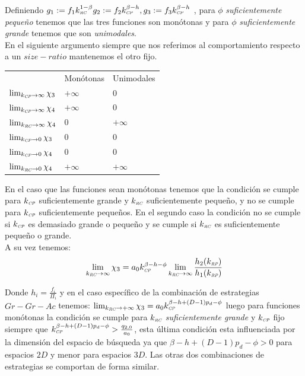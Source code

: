 Definiendo $g_1:= f_1 k_{\textit{\tiny RC}}^{1-\beta} g_2:= f_2 k_{\textit{\tiny CP}}^{\beta- h} , g_3 := f_3 k_{\textit{\tiny CP}}^{\beta-h} $ , para $\phi$ \emph{suficientemente peque\~no} tenemos que las tres funciones son mon\'otonas y para $\phi$ \emph{suficientemente grande} tenemos que son \emph{unimodales}.\\

En el siguiente argumento siempre que nos referimos al comportamiento respecto a un $size-ratio$ mantenemos el otro fijo.\\

\begin{tabular}{p{1.5in}|m{1.5in}|m{1.5in}} 
 & Mon\'otonas  & Unimodales \\
$\lim_{k_{\textit{\tiny CP}} \to \infty} \chi_3$ & $+\infty$  & 0 \\
$\lim_{k_{\textit{\tiny CP}} \to \infty} \chi_4$ & $+\infty$  & 0 \\
$\lim_{k_{\textit{\tiny RC}} \to \infty} \chi_4$ & 0  & $+\infty$ \\
$\lim_{k_{\textit{\tiny CP}} \to 0} \chi_3$ & 0 & 0 \\
$\lim_{k_{\textit{\tiny CP}} \to 0} \chi_4$ & 0 & 0 \\
$\lim_{k_{\textit{\tiny RC}} \to 0} \chi_4$ & $+\infty$ & $+\infty$ \\
\end{tabular}

En el caso que las funciones sean mon\'otonas tenemos que la condici\'on se cumple para $k_{\textit{\tiny CP}}$ suficientemente grande y $k_{\textit{\tiny RC}}$ suficientemente peque\~no, y no se cumple para $k_{\textit{\tiny CP}}$ suficientemente peque\~nos. En el segundo caso la condici\'on no se cumple si $k_{\textit{\tiny CP}}$ es demasiado grande o peque\~no y se cumple si $k_{\textit{\tiny RC}}$ es suficientemente peque\~no o grande.\\

A su vez tenemos:
\begin{equation}
  \lim_{k_{\textit{\tiny RC}} \to \infty} \chi_3 = a_0 k_{\textit{\tiny CP}}^{\beta - h - \phi} \lim_{k_{\textit{\tiny RC}} \to \infty} \frac{h_2(k_{\textit{\tiny RP}})}{h_1(k_{\textit{\tiny RP}})} 
\end{equation}

Donde $h_i = \frac{f_i}{\Pi_i}$ y en el caso espec\'ifico de la combinaci\'on de estrategias $Gr-Gr-Ac$ tenemos: $\lim_{k_{\textit{\tiny RC}} \to +\infty} \chi_3 = a_0 k_{\textit{\tiny CP}}^{\beta -h + (D-1)p_d - \phi}$ luego para funciones mon\'otonas la condici\'on se cumple para $k_{\textit{\tiny RC}}$ \emph{suficientemente grande} y $k_{\textit{\tiny CP}}$ fijo siempre que $k_{\textit{\tiny CP}}^{\beta - h + (D-1)p_d - \phi} > \frac{q_{2,0}}{a_0}$, esta \'ultima condici\'on esta influenciada por la dimensi\'on del espacio de b\'usqueda ya que $ \beta - h + (D-1)p_d - \phi >0$ para espacios $2D$ y menor para espacios $3D$. Las otras dos combinaciones de estrategias se comportan de forma similar.\\

